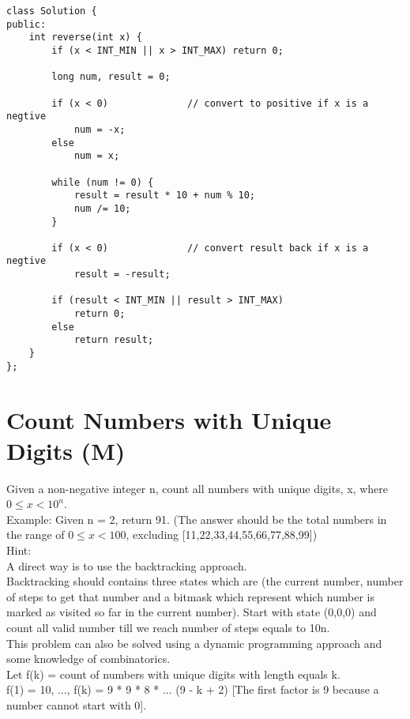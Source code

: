 \begin{lstlisting}
class Solution {
public:
    int reverse(int x) {
        if (x < INT_MIN || x > INT_MAX) return 0;
       
        long num, result = 0;
      
        if (x < 0)              // convert to positive if x is a negtive
            num = -x;
        else
            num = x;
      
        while (num != 0) {
            result = result * 10 + num % 10;
            num /= 10;
        }
        
        if (x < 0)              // convert result back if x is a negtive
            result = -result;

        if (result < INT_MIN || result > INT_MAX)
            return 0;
        else
            return result;
    }
};
\end{lstlisting}


\section{Count Numbers with Unique Digits (M)}
Given a non-negative integer n, count all numbers with unique digits, x, where $0 \leq x < 10^n$.\\

Example:
Given n = 2, return 91. (The answer should be the total numbers in the range of $0 \leq x < 100$, excluding [11,22,33,44,55,66,77,88,99]) \\

Hint:\\
    A direct way is to use the backtracking approach.\\
    Backtracking should contains three states which are (the current number, number of steps to get that number and a bitmask which represent which number is marked as visited so far in the current number). Start with state (0,0,0) and count all valid number till we reach number of steps equals to 10n.\\
    This problem can also be solved using a dynamic programming approach and some knowledge of combinatorics.\\
    Let f(k) = count of numbers with unique digits with length equals k.\\
    f(1) = 10, ..., f(k) = 9 * 9 * 8 * ... (9 - k + 2) [The first factor is 9 because a number cannot start with 0].\\

